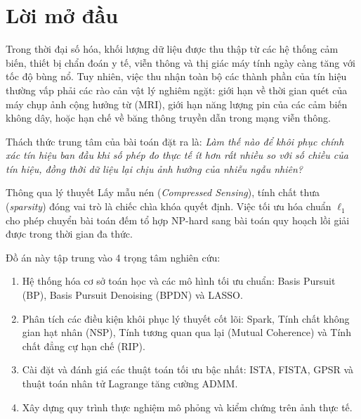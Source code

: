 \chapter*{Lời mở đầu}

Trong thời đại số hóa, khối lượng dữ liệu được thu thập từ các hệ thống cảm biến, thiết bị chẩn đoán y tế, viễn thông và thị giác máy tính ngày càng tăng với tốc độ bùng nổ. Tuy nhiên, việc thu nhận toàn bộ các thành phần của tín hiệu thường vấp phải các rào cản vật lý nghiêm ngặt: giới hạn về thời gian quét của máy chụp ảnh cộng hưởng từ (MRI), giới hạn năng lượng pin của các cảm biến không dây, hoặc hạn chế về băng thông truyền dẫn trong mạng viễn thông.

Thách thức trung tâm của bài toán đặt ra là: \emph{Làm thế nào để khôi phục chính xác tín hiệu ban đầu khi số phép đo thực tế ít hơn rất nhiều so với số chiều của tín hiệu, đồng thời dữ liệu lại chịu ảnh hưởng của nhiễu ngẫu nhiên?}

Thông qua lý thuyết Lấy mẫu nén (\emph{Compressed Sensing}), tính chất thưa (\emph{sparsity}) đóng vai trò là chiếc chìa khóa quyết định. Việc tối ưu hóa chuẩn $\ell_1$ cho phép chuyển bài toán đếm tổ hợp NP-hard sang bài toán quy hoạch lồi giải được trong thời gian đa thức.

Đồ án này tập trung vào 4 trọng tâm nghiên cứu:
\begin{enumerate}
    \item Hệ thống hóa cơ sở toán học và các mô hình tối ưu chuẩn: Basis Pursuit (BP), Basis Pursuit Denoising (BPDN) và LASSO.
    \item Phân tích các điều kiện khôi phục lý thuyết cốt lõi: Spark, Tính chất không gian hạt nhân (NSP), Tính tương quan qua lại (Mutual Coherence) và Tính chất đẳng cự hạn chế (RIP).
    \item Cài đặt và đánh giá các thuật toán tối ưu bậc nhất: ISTA, FISTA, GPSR và thuật toán nhân tử Lagrange tăng cường ADMM.
    \item Xây dựng quy trình thực nghiệm mô phỏng và kiểm chứng trên ảnh thực tế.
\end{enumerate}
